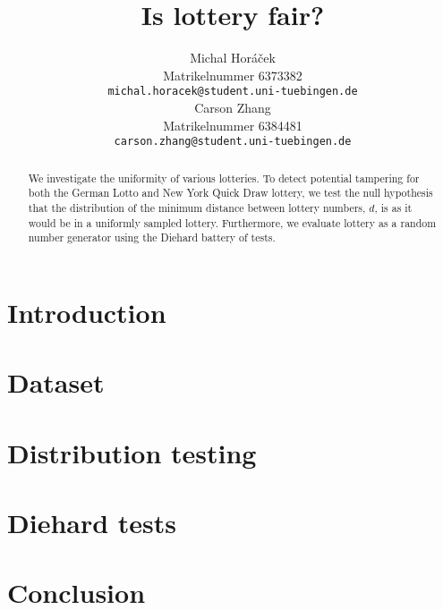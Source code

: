 \documentclass{article}
\title{Is lottery fair?}
\author{%
  Michal Horáček\\
  Matrikelnummer 6373382\\
  \texttt{michal.horacek@student.uni-tuebingen.de} \\
  \And
  Carson Zhang\\
  Matrikelnummer 6384481\\
  \texttt{carson.zhang@student.uni-tuebingen.de} \\
}
\begin{document}
\maketitle

\begin{abstract}
    We investigate the uniformity of various lotteries. 
    To detect potential tampering for both the German Lotto and New York Quick Draw lottery, we test the null hypothesis that the distribution of the minimum distance between
    lottery numbers, $d$, is as it would be in a uniformly sampled lottery.
    Furthermore, we evaluate lottery as a random number generator using the Diehard battery of tests.
\end{abstract}

\section{Introduction}
\label{sec:introduction}


\section{Dataset}
\label{sec:dataset}


\section{Distribution testing}
\label{sec:distribution_testing}


\section{Diehard tests}
\label{sec:diehard}


\section{Conclusion}
\label{sec:conclusion}


\newpage



\end{document}
